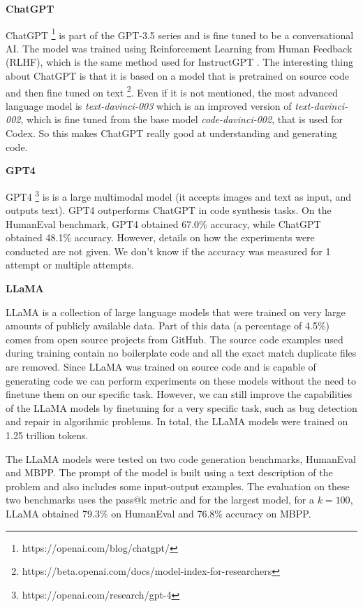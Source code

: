 \documentclass[12pt,a4paper]{report}
\begin{document}
\textbf{ChatGPT} 

ChatGPT \footnote{https://openai.com/blog/chatgpt/} is part of the GPT-3.5 series and is fine tuned to be a conversational AI. The model was trained using Reinforcement Learning from Human Feedback (RLHF), which is the same method used for InstructGPT \cite{https://doi.org/10.48550/arxiv.2203.02155}. The interesting thing about ChatGPT is that it is based on a model that is pretrained on source code and then fine tuned on text \footnote{https://beta.openai.com/docs/model-index-for-researchers}. Even if it is not mentioned, the most advanced language model is \textit{text-davinci-003} which is an improved version of \textit{text-davinci-002}, which is fine tuned from the base model \textit{code-davinci-002}, that is used for Codex. So this makes ChatGPT really good at understanding and generating code.

\textbf{GPT4}

GPT4 \footnote{https://openai.com/research/gpt-4} is is a large multimodal model (it accepts images and text as input, and outputs text). GPT4 outperforms ChatGPT in code synthesis tasks. On the HumanEval \cite{chen2021evaluating} benchmark, GPT4 obtained 67.0\% accuracy, while ChatGPT obtained 48.1\% accuracy. However, details on how the experiments were conducted are not given. We don't know if the accuracy was measured for 1 attempt or multiple attempts.

\textbf{LLaMA}

LLaMA \cite{touvron2023llama} is a collection of large language models that were trained on very large amounts of publicly available data. Part of this data (a percentage of 4.5\%) comes from open source projects from GitHub. The source code examples used during training contain no boilerplate code and all the exact match duplicate files are removed. Since LLaMA was trained on source code and is capable of generating code we can perform experiments on these models without the need to finetune them on our specific task. However, we can still improve the capabilities of the LLaMA models by finetuning for a very specific task, such as bug detection and repair in algorihmic problems. In total, the LLaMA models were trained on 1.25 trillion tokens.

The LLaMA models were tested on two code generation benchmarks, HumanEval and MBPP. The prompt of the model is built using a text description of the problem and also includes some input-output examples. The evaluation on these two benchmarks uses the pass@k metric and for the largest model, for a $k=100$, LLaMA obtained 79.3\% on HumanEval and 76.8\% accuracy on MBPP.
\end{document}
